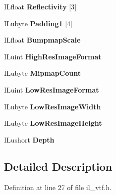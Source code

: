 \begin{DoxyCompactItemize}
I\+Lfloat {\bfseries Reflectivity} \mbox{[}3\mbox{]}
\item 
\mbox{\label{structVTFHEAD_ae7025c865302c9d3807d7cc45d2d8fbc}} 
I\+Lubyte {\bfseries Padding1} \mbox{[}4\mbox{]}
\item 
\mbox{\label{structVTFHEAD_aea27568542bae7cbc6f43f70f7ec47b3}} 
I\+Lfloat {\bfseries Bumpmap\+Scale}
\item 
\mbox{\label{structVTFHEAD_a68137efdf254834549e60eec6f0b2909}} 
I\+Luint {\bfseries High\+Res\+Image\+Format}
\item 
\mbox{\label{structVTFHEAD_af913c5021604e6005e98ded62c82c148}} 
I\+Lubyte {\bfseries Mipmap\+Count}
\item 
\mbox{\label{structVTFHEAD_a0ef32cbabddf49b92d60a682276c6b4d}} 
I\+Luint {\bfseries Low\+Res\+Image\+Format}
\item 
\mbox{\label{structVTFHEAD_a47c5cb131348d5076ffdaea5dbebb298}} 
I\+Lubyte {\bfseries Low\+Res\+Image\+Width}
\item 
\mbox{\label{structVTFHEAD_af93c8ba602ebdf4cd99e8f62debdb8f9}} 
I\+Lubyte {\bfseries Low\+Res\+Image\+Height}
\item 
\mbox{\label{structVTFHEAD_aeb8b442167a6d8cdec2cd6dc68c4fb76}} 
I\+Lushort {\bfseries Depth}
\end{DoxyCompactItemize}


\subsection{Detailed Description}


Definition at line 27 of file il\+\_\+vtf.\+h.



